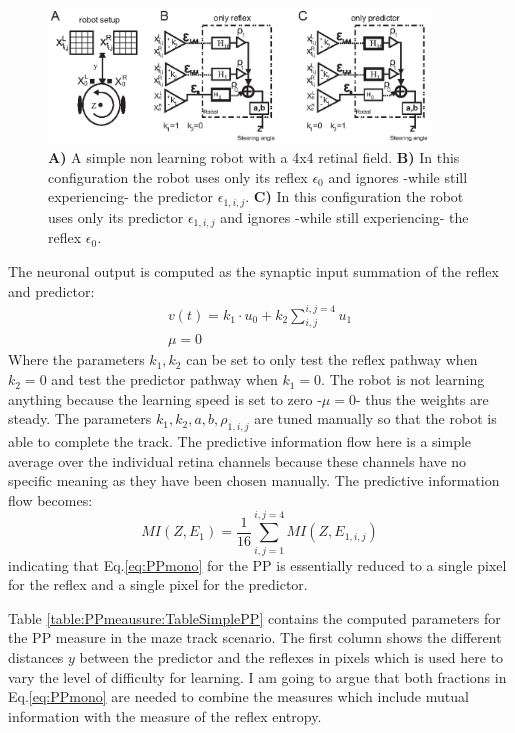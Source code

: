 \begin{figure}[!hbt]
	\begin{center}
		\includegraphics[width=0.9\textwidth]{figures/ppmeasure/4}
	\end{center}
	\caption[Simple retinal robot]{
	{\bf A)} A simple non learning robot with a 4x4 retinal field. 
	{\bf B)} In this configuration the robot uses only its reflex $\epsilon_0$ and ignores -while still experiencing- the predictor $\epsilon_{1,i,j}$. 
	{\bf C)} In this configuration the robot uses only its predictor $\epsilon_{1,i,j}$ and ignores -while still experiencing- the reflex $\epsilon_0$. 	
	\label{PPmeasure:Figure4}} 
\end{figure}

The neuronal output is computed as the synaptic input summation of the reflex and predictor:
\begin{equation}
  \begin{array}{ll}
	v(t)=k_1\cdot u_{0}+k_2 \sum\limits_{i,j}^{i,j=4} u_{1}\\ 
        \mu=0
  \end{array}
\label{MotorSimple}
\end{equation}
Where the parameters $k_1,k_2$ can be set to only test the reflex pathway when
$k_2=0$ and test the predictor pathway when $k_1=0$.
The robot is not learning anything because the learning speed is set to
zero -$\mu=0$- thus the weights are steady. The parameters $k_1,k_2,a,b,\rho_{1,i,j}$ are 
tuned manually so that the robot is able to complete the track.
The predictive information flow here is a simple average over the individual retina channels
because these channels have no specific meaning as they have been chosen manually.
The predictive information flow becomes:
 \begin{equation}
 MI(Z,E_1)=\frac{1}{16} \sum\limits_{i,j=1}^{i,j=4} MI(Z,E_{1,i,j})
 \end{equation}
indicating that Eq.\ref{eq:PPmono} for the PP is essentially reduced to a single pixel 
for the reflex and a single pixel for the predictor. 

Table \ref{table:PPmeausure:TableSimplePP} contains the computed parameters for 
the PP measure in the maze track scenario.
The first column shows the different distances $y$ between the predictor and the reflexes
in pixels which is used here to vary the level of difficulty for learning.
I am going to argue that both fractions in Eq.\ref{eq:PPmono} are needed to combine
the measures which include mutual information with the measure of the reflex entropy.


